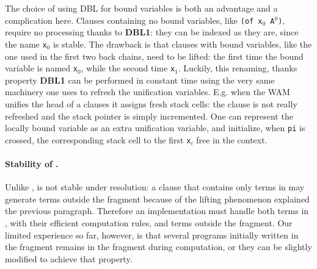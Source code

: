 \documentclass{llncs}
\begin{document}
The choice of using DBL for bound variables is both an advantage and a
complication here.
Clauses containing no bound variables, like
\verb+(of x+$_0$\verb+ A+$^0$\verb+)+, require no processing thanks to
\textbf{DBL1}: they can be indexed as they are, since the name \verb+x+$_0$
is stable.
The drawback is that clauses with bound variables, like the one 
used in the first two back chains, need to be lifted: the first time the
bound variable is named \verb+x+$_0$,
while the second time \verb+x+$_1$.
Luckily, this renaming, thanks property \textbf{DBL1}
can be performed in constant time using the very same machinery one uses to
refresh the unification variables.
E.g. when the WAM unifies the head of a clauses it assigns 
fresh stack cells: the clause is not really refreshed and the stack
pointer is simply incremented.  One can represent the locally bound variable as
an extra unification variable, and initialize, when \verb+pi+ is crossed, the
corresponding stack cell to the first \verb+x+$_i$ free in the context.

\paragraph{Stability of \rff{}.}
Unlike \Ll{}, \rff{} is not stable under \lp{} resolution:
a clause that contains only terms in \rff{}
may generate terms
outside the fragment
because
of the lifting phenomenon explained the previous paragraph.
Therefore an implementation must handle both terms in \rff{}, with their
efficient computation rules, and terms outside the fragment. Our limited
experience so far, however, is that several programs initially written in the
fragment remains in the fragment during computation, or they can be slightly
modified to achieve that property.
\end{document}

